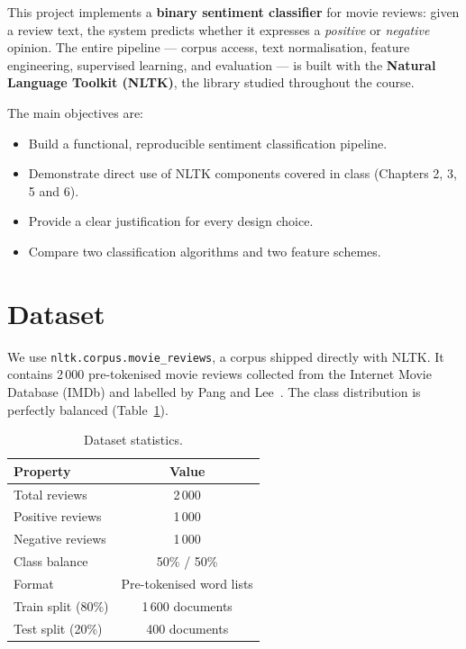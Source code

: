 \documentclass[11pt,a4paper]{article}
\begin{document}
This project implements a \textbf{binary sentiment classifier} for movie reviews:
given a review text, the system predicts whether it expresses a \emph{positive} or
\emph{negative} opinion. The entire pipeline --- corpus access, text normalisation,
feature engineering, supervised learning, and evaluation --- is built with the
\textbf{Natural Language Toolkit (NLTK)}, the library studied throughout the course.

The main objectives are:
\begin{itemize}[noitemsep]
  \item Build a functional, reproducible sentiment classification pipeline.
  \item Demonstrate direct use of NLTK components covered in class (Chapters 2, 3, 5 and 6).
  \item Provide a clear justification for every design choice.
  \item Compare two classification algorithms and two feature schemes.
\end{itemize}

\section{Dataset}

We use \texttt{nltk.corpus.movie\_reviews}, a corpus shipped directly with NLTK. It
contains 2\,000 pre-tokenised movie reviews collected from the Internet Movie Database
(IMDb) and labelled by Pang and Lee~\cite{pang2002thumbs}. The class distribution is
perfectly balanced (Table~\ref{tab:dataset}).

\begin{table}[H]
  \centering
  \caption{Dataset statistics.}
  \label{tab:dataset}
  \begin{tabular}{lc}
    \toprule
    \textbf{Property} & \textbf{Value} \\
    \midrule
    Total reviews      & 2\,000 \\
    Positive reviews   & 1\,000 \\
    Negative reviews   & 1\,000 \\
    Class balance      & 50\% / 50\% \\
    Format             & Pre-tokenised word lists \\
    Train split (80\%) & 1\,600 documents \\
    Test split  (20\%) & 400 documents \\
    \bottomrule
  \end{tabular}
\end{table}
\end{document}
